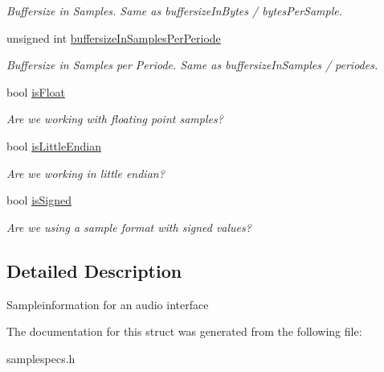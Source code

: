 \begin{DoxyCompactItemize}
\begin{DoxyCompactList}\small\item\em Buffersize in Samples. Same as buffersize\-In\-Bytes / bytes\-Per\-Sample. \end{DoxyCompactList}\item 
\hypertarget{structNl_1_1SampleSpecs_a0eada55de7ffd0e7e003c0e7b1178f9e}{unsigned int \hyperlink{structNl_1_1SampleSpecs_a0eada55de7ffd0e7e003c0e7b1178f9e}{buffersize\-In\-Samples\-Per\-Periode}}\label{structNl_1_1SampleSpecs_a0eada55de7ffd0e7e003c0e7b1178f9e}

\begin{DoxyCompactList}\small\item\em Buffersize in Samples per Periode. Same as buffersize\-In\-Samples / periodes. \end{DoxyCompactList}\item 
\hypertarget{structNl_1_1SampleSpecs_af8f9731e285cf005f5376f8336537802}{bool \hyperlink{structNl_1_1SampleSpecs_af8f9731e285cf005f5376f8336537802}{is\-Float}}\label{structNl_1_1SampleSpecs_af8f9731e285cf005f5376f8336537802}

\begin{DoxyCompactList}\small\item\em Are we working with floating point samples? \end{DoxyCompactList}\item 
\hypertarget{structNl_1_1SampleSpecs_afbe0390e78858f374b33be0a1bd52e63}{bool \hyperlink{structNl_1_1SampleSpecs_afbe0390e78858f374b33be0a1bd52e63}{is\-Little\-Endian}}\label{structNl_1_1SampleSpecs_afbe0390e78858f374b33be0a1bd52e63}

\begin{DoxyCompactList}\small\item\em Are we working in little endian? \end{DoxyCompactList}\item 
\hypertarget{structNl_1_1SampleSpecs_aa0438c5aab14844ec311f736024c4507}{bool \hyperlink{structNl_1_1SampleSpecs_aa0438c5aab14844ec311f736024c4507}{is\-Signed}}\label{structNl_1_1SampleSpecs_aa0438c5aab14844ec311f736024c4507}

\begin{DoxyCompactList}\small\item\em Are we using a sample format with signed values? \end{DoxyCompactList}\end{DoxyCompactItemize}


\subsection{Detailed Description}
Sampleinformation for an audio interface 

The documentation for this struct was generated from the following file\-:\begin{DoxyCompactItemize}
\item 
samplespecs.\-h\end{DoxyCompactItemize}
